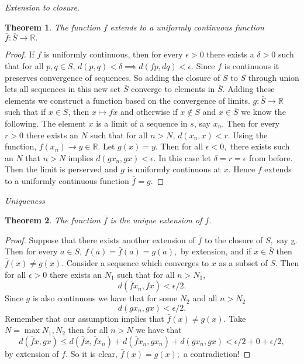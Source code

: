 \documentclass[letter]{article}
\newtheorem{theorem}{Theorem}
\newenvironment{menumerate}{%
  \edef\backupindent{\the\parindent}%
  \enumerate%
  \setlength{\parindent}{\backupindent}%
}{\endenumerate}
\begin{document}
\begin{menumerate}
			\begin{menumerate}
				\item \emph{Extension to closure.}
					\begin{theorem}
						The function $f$ extends to a uniformly continuous function $\bar f: \bar S \to \mathbb{R}.$
					\end{theorem}
					\begin{proof}
						If $f$ is uniformly continuous, then for every $\epsilon > 0$ there exists a $\delta > 0$ such that for all $p,q \in S$, $d(p,q) < \delta \implies d(fp,dq) < \epsilon.$ Since $f$ is continuous it preserves convergence of sequences. So adding the closure of $S$ to $S$ through union lets all sequences in this new set $\bar S$ converge to elements in $\bar S$. Adding these elements we construct a function based on the convergence of limits. $g : \bar S \to \mathbb{R}$  such that if $x \in S$, then $x \mapsto fx$ and otherwise if $x \notin S$ and $x \in \bar S$ we know the following. The element $x$ is a limit of a sequence in $s$, say $x_n$. Then for every $r > 0$ there exists an $N$ such that for all $n > N$, $d(x_n,x) < r.$ Using the function, $f(x_n) \to y \in \mathbb{R}$. Let $g(x) = y.$ Then for all $\epsilon < 0,$ there exists such an $N$ that $n>N$ implies $d(g x_n, g x) < \epsilon.$ In this case let $\delta = r = \epsilon$ from before. Then the limit is perserved and $g$ is uniformly continuous at $x$. Hence $f$ extends to a uniformly continuous function $\bar f = g$.
					\end{proof}

				\item \emph{Uniqueness}
					\begin{theorem}
						The function $\bar f$ is the unique extension of $f$.
					\end{theorem}
					\begin{proof}
						Suppose that there exists another extension of $\bar f$ to the closure of $S,$ say g. Then for every $a \in S$, $f(a) = \bar f(a) = g(a),$ by extension, and if $x \in \bar S$ then $\bar f(x) \neq g(x).$ Consider a sequence which converges to $x$ as a subset of $S$. Then for all $\epsilon > 0$ there exists an $N_1$ such that for all $n > N_1$, $$d(\bar fx_n, fx) < \epsilon/2.$$ Since $g$ is also continuous we have that for some $N_2$ and all $n> N_2$ $$d(gx_n,gx) < \epsilon/2.$$ Remember that our assumption implies that $\bar f(x) \neq g(x).$ Take $N = \max{N_1, N_2}$ then for all $n > N$ we have that 
						$$d(\bar fx,gx) \leq d(\bar fx, \bar fx_n) + d(\bar fx_n, gx_n) + d(gx_n, gx) < \epsilon/2 + 0 + \epsilon/2,$$
						by extension of $f.$ So it is clear, $\bar f(x) = g(x);$ a contradiction!


\end{proof}
\end{menumerate}
\end{menumerate}
\end{document}
